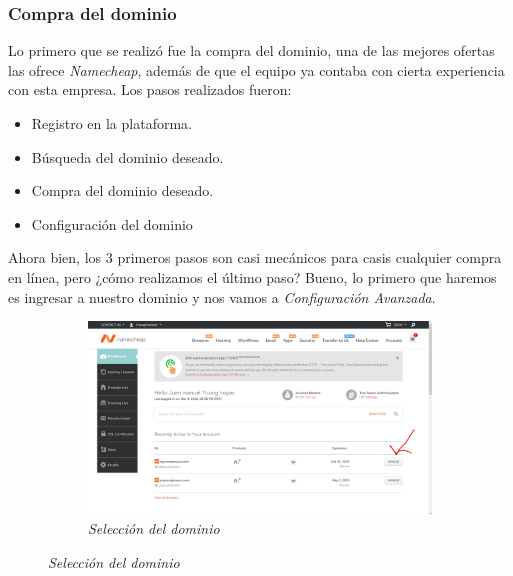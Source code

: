 \subsubsection{Compra del dominio}
Lo primero que se realizó fue la compra del dominio, una de las mejores ofertas
las ofrece \textit{Namecheap}, además de que el equipo ya contaba con cierta
experiencia con esta empresa. Los pasos realizados fueron:

\begin{itemize}
    \item Registro en la plataforma.
    \item Búsqueda del dominio deseado.
    \item Compra del dominio deseado.
    \item Configuración del dominio 
\end{itemize}

Ahora bien, los 3 primeros pasos son casi mecánicos para casis cualquier compra
en línea, pero ¿cómo realizamos el último paso? Bueno, lo primero que haremos es
ingresar a nuestro dominio y nos vamos a \textit{Configuración Avanzada}.

\begin{figure}[H]
    \centering
    \begin{subfigure}[b]{0.8\textwidth}
        \centering
        \includegraphics[width=\textwidth]{Figures/0. General/domain_selection.png}
        \caption{\textit{Selección del dominio}}
        \label{fig: domain selection}
    \end{subfigure}
\end{figure}

